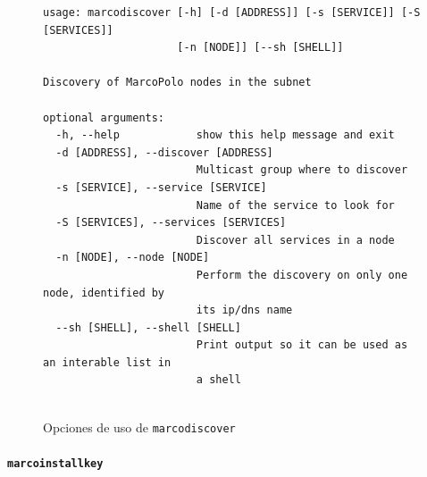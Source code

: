 \begin{figure}[H]
\centering



\begin{lstlisting}
usage: marcodiscover [-h] [-d [ADDRESS]] [-s [SERVICE]] [-S [SERVICES]]
                     [-n [NODE]] [--sh [SHELL]]

Discovery of MarcoPolo nodes in the subnet

optional arguments:
  -h, --help            show this help message and exit
  -d [ADDRESS], --discover [ADDRESS]
                        Multicast group where to discover
  -s [SERVICE], --service [SERVICE]
                        Name of the service to look for
  -S [SERVICES], --services [SERVICES]
                        Discover all services in a node
  -n [NODE], --node [NODE]
                        Perform the discovery on only one node, identified by
                        its ip/dns name
  --sh [SHELL], --shell [SHELL]
                        Print output so it can be used as an interable list in
                        a shell


\end{lstlisting}
\caption{Opciones de uso de \texttt{marcodiscover}}
\label{fig:marcodiscover_help}
\end{figure}

\paragraph{\texttt{marcoinstallkey}\\}
\label{marcoinstallkey}


